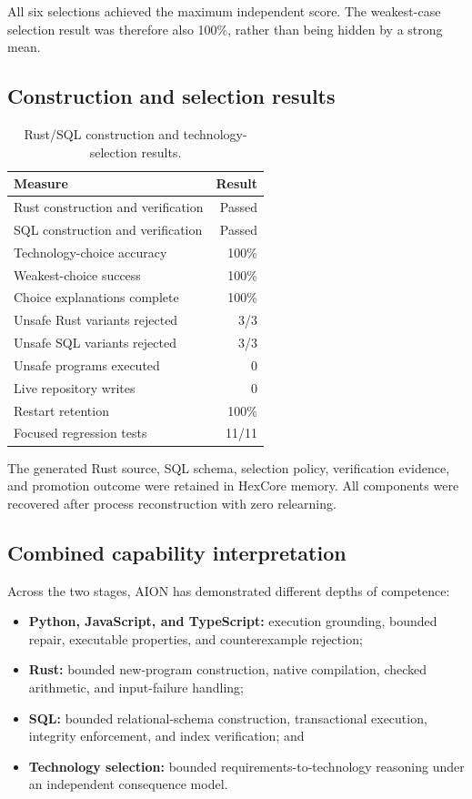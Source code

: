All six selections achieved the maximum independent score.  The weakest-case
selection result was therefore also 100\%, rather than being hidden by a strong
mean.

\subsection{Construction and selection results}

\begin{table}[ht]
\centering
\caption{Rust/SQL construction and technology-selection results.}
\label{tab:rust-sql-selection-results}
\begin{tabular}{lr}
\hline
Measure & Result \\
\hline
Rust construction and verification & Passed \\
SQL construction and verification & Passed \\
Technology-choice accuracy & 100\% \\
Weakest-choice success & 100\% \\
Choice explanations complete & 100\% \\
Unsafe Rust variants rejected & 3/3 \\
Unsafe SQL variants rejected & 3/3 \\
Unsafe programs executed & 0 \\
Live repository writes & 0 \\
Restart retention & 100\% \\
Focused regression tests & 11/11 \\
\hline
\end{tabular}
\end{table}

The generated Rust source, SQL schema, selection policy, verification evidence,
and promotion outcome were retained in HexCore memory.  All components were
recovered after process reconstruction with zero relearning.

\subsection{Combined capability interpretation}

Across the two stages, AION has demonstrated different depths of competence:
\begin{itemize}
  \item \textbf{Python, JavaScript, and TypeScript:} execution grounding,
        bounded repair, executable properties, and counterexample rejection;
  \item \textbf{Rust:} bounded new-program construction, native compilation,
        checked arithmetic, and input-failure handling;
  \item \textbf{SQL:} bounded relational-schema construction, transactional
        execution, integrity enforcement, and index verification; and
  \item \textbf{Technology selection:} bounded requirements-to-technology
        reasoning under an independent consequence model.
\end{itemize}

